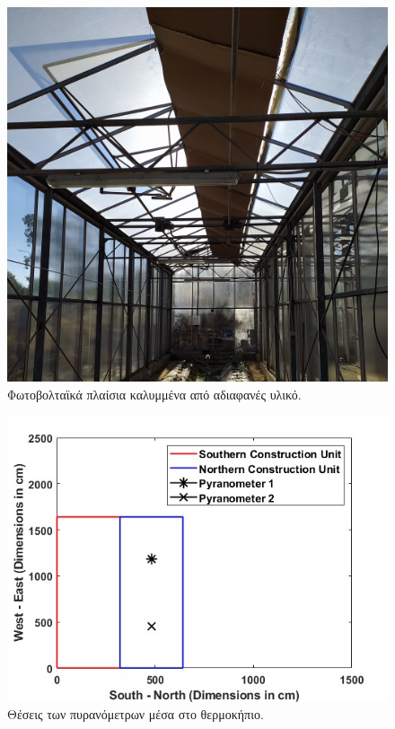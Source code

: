 \documentclass[12pt, a4paper]{report} %
\begin{document}
\begin{figure}[ht]%
    \centering
    \includegraphics[scale=0.08]{Figures/opaque_cover.jpg}
    \caption{Φωτοβολταϊκά πλαίσια καλυμμένα από αδιαφανές υλικό.}
    \label{fig_opaque_cover}
\end{figure}

\begin{figure}[ht]%
    \centering
    \includegraphics[scale=0.55]{Figures/pyranometers_pos.jpg}
    \caption{Θέσεις των πυρανόμετρων μέσα στο θερμοκήπιο.}
    \label{fig_pyranometers_pos}
\end{figure}
\end{document}
